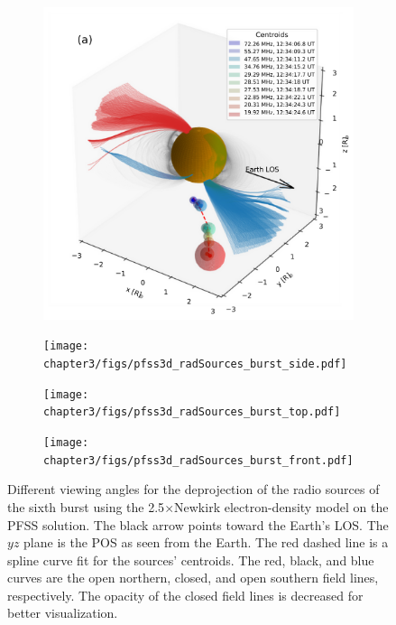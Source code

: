 \begin{figure}[!htp]
	\centering
	\begin{subfigure}{0.45\linewidth}
		\centering
		\includegraphics[width=\linewidth]{chapter3/figs/pfss3d_radSources_burst_angle.pdf}
		\label{subfig:a}
	\end{subfigure}
	\hfill
	\begin{subfigure}{0.45\linewidth}
		\centering
		\texttt{[image: chapter3/figs/pfss3d\_radSources\_burst\_side.pdf]}
		\label{subfig:b}
	\end{subfigure}
	
	\begin{subfigure}{0.45\linewidth}
		\centering
		\texttt{[image: chapter3/figs/pfss3d\_radSources\_burst\_top.pdf]}
		\label{subfig:c}
	\end{subfigure}
	\hfill
	\begin{subfigure}{0.45\linewidth}
		\centering
		\texttt{[image: chapter3/figs/pfss3d\_radSources\_burst\_front.pdf]}
		\label{subfig:d}
	\end{subfigure}
	\caption{Different viewing angles for the deprojection of the radio sources of the sixth burst using the 2.5$\times$Newkirk electron-density model on the PFSS solution. The black arrow points toward the Earth's LOS. The $yz$ plane is the POS as seen from the Earth. The red dashed line is a spline curve fit for the sources' centroids. The red, black, and blue curves are the open northern, closed, and open southern field lines, respectively. The opacity of the closed field lines is decreased for better visualization.}
	\label{fig_3figs}
\end{figure}


